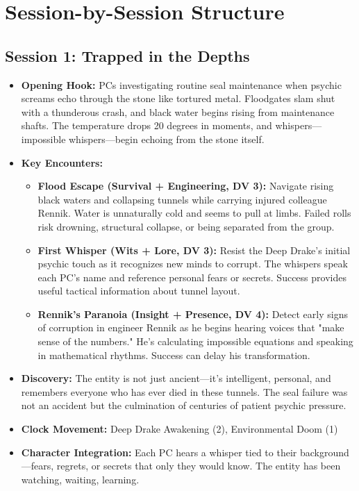 \documentclass[11pt]{article}
\begin{document}
\section{Session-by-Session Structure}

\subsection{Session 1: Trapped in the Depths}
\begin{itemize}
\item \textbf{Opening Hook:} PCs investigating routine seal maintenance when psychic screams echo through the stone like tortured metal. Floodgates slam shut with a thunderous crash, and black water begins rising from maintenance shafts. The temperature drops 20 degrees in moments, and whispers—impossible whispers—begin echoing from the stone itself.
\item \textbf{Key Encounters:}
  \begin{itemize}
  \item \textbf{Flood Escape (Survival + Engineering, DV 3):} Navigate rising black waters and collapsing tunnels while carrying injured colleague Rennik. Water is unnaturally cold and seems to pull at limbs. Failed rolls risk drowning, structural collapse, or being separated from the group.
  \item \textbf{First Whisper (Wits + Lore, DV 3):} Resist the Deep Drake's initial psychic touch as it recognizes new minds to corrupt. The whispers speak each PC's name and reference personal fears or secrets. Success provides useful tactical information about tunnel layout.
  \item \textbf{Rennik's Paranoia (Insight + Presence, DV 4):} Detect early signs of corruption in engineer Rennik as he begins hearing voices that "make sense of the numbers." He's calculating impossible equations and speaking in mathematical rhythms. Success can delay his transformation.
  \end{itemize}
\item \textbf{Discovery:} The entity is not just ancient—it's intelligent, personal, and remembers everyone who has ever died in these tunnels. The seal failure was not an accident but the culmination of centuries of patient psychic pressure.
\item \textbf{Clock Movement:} Deep Drake Awakening (2), Environmental Doom (1)
\item \textbf{Character Integration:} Each PC hears a whisper tied to their background—fears, regrets, or secrets that only they would know. The entity has been watching, waiting, learning.
\end{itemize}
\end{document}
